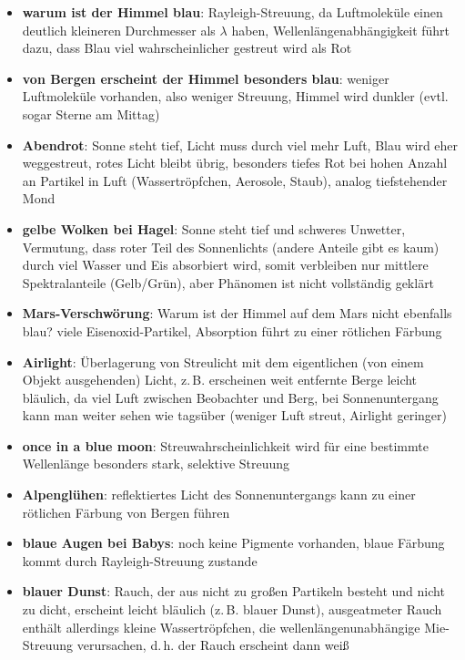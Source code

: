 \begin{itemize}
    \item
    \textbf{warum ist der Himmel blau}:
    Rayleigh-Streuung, da Luftmoleküle einen deutlich kleineren Durchmesser
    als $\lambda$ haben, Wellenlängenabhängigkeit führt dazu, dass Blau
    viel wahrscheinlicher gestreut wird als Rot

    \item
    \textbf{von Bergen erscheint der Himmel besonders blau}:
    weniger Luftmoleküle vorhanden, also weniger Streuung, Himmel wird dunkler
    (evtl. sogar Sterne am Mittag)

    \item
    \textbf{Abendrot}:
    Sonne steht tief, Licht muss durch viel mehr Luft, Blau wird eher
    weggestreut, rotes Licht bleibt übrig,
    besonders tiefes Rot bei hohen Anzahl an Partikel in Luft
    (Wassertröpfchen, Aerosole, Staub),
    analog tiefstehender Mond

    \item
    \textbf{gelbe Wolken bei Hagel}:
    Sonne steht tief und schweres Unwetter, Vermutung, dass roter Teil des
    Sonnenlichts (andere Anteile gibt es kaum) durch viel Wasser und Eis
    absorbiert wird, somit verbleiben nur mittlere Spektralanteile
    (Gelb/Grün), aber Phänomen ist nicht vollständig geklärt

    \item
    \textbf{Mars-Verschwörung}:
    Warum ist der Himmel auf dem Mars nicht ebenfalls blau?
    viele Eisenoxid-Partikel, Absorption führt zu einer rötlichen Färbung

    \item
    \textbf{Airlight}:
    Überlagerung von Streulicht mit dem eigentlichen
    (von einem Objekt ausgehenden) Licht,
    z.\,B. erscheinen weit entfernte Berge leicht bläulich, da viel Luft
    zwischen Beobachter und Berg,
    bei Sonnenuntergang kann man weiter sehen wie tagsüber
    (weniger Luft streut, Airlight geringer)

    \item
    \textbf{once in a blue moon}:
    Streuwahrscheinlichkeit wird für eine bestimmte Wellenlänge besonders
    stark, selektive Streuung

    \item
    \textbf{Alpenglühen}:
    reflektiertes Licht des Sonnenuntergangs kann zu einer rötlichen
    Färbung von Bergen führen
\end{itemize}
\linie
\pagebreak
\begin{itemize}
    \item
    \textbf{blaue Augen bei Babys}:
    noch keine Pigmente vorhanden, blaue Färbung kommt durch Rayleigh-Streuung
    zustande

    \item
    \textbf{blauer Dunst}:
    Rauch, der aus nicht zu großen Partikeln besteht und nicht zu dicht,
    erscheint leicht bläulich (z.\,B. blauer Dunst),
    ausgeatmeter Rauch enthält allerdings kleine Wassertröpfchen,
    die wellenlängenunabhängige Mie-Streuung verursachen, d.\,h. der Rauch
    erscheint dann weiß
\end{itemize}
